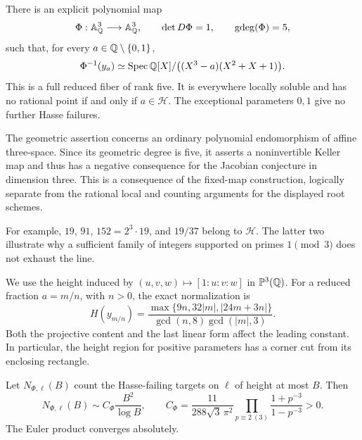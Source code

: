 \begin{theorem}
\label{thm:main}
There is an explicit polynomial map
\[
 \Phi:\mathbb A^3_\mathbb Q\longrightarrow\mathbb A^3_\mathbb Q,
 \qquad \det D\Phi=1,\qquad \operatorname{gdeg}(\Phi)=5,
\]
such that, for every \(a\in\mathbb Q\setminus\{0,1\}\),
\begin{equation}
 \Phi^{-1}(y_a)\simeq
 \operatorname{Spec}\mathbb Q[X]/\bigl((X^3-a)(X^2+X+1)\bigr).
 \label{eq:main-fiber}
\end{equation}
This is a full reduced fiber of rank five. It is everywhere locally
soluble and has no rational point if and only if \(a\in\mathcal H\).
The exceptional parameters \(0,1\) give no further Hasse failures.
\end{theorem}

The geometric assertion concerns an ordinary polynomial endomorphism of
affine three-space. Since its geometric degree is five, it asserts a
noninvertible Keller map and thus has a negative consequence for the
Jacobian conjecture in dimension three. This is a consequence of the
fixed-map construction, logically separate from the rational local and
counting arguments for the displayed root schemes.

For example, \(19\), \(91\), \(152=2^3\cdot19\), and \(19/37\) belong
to \(\mathcal H\). The latter two illustrate why a sufficient family of
integers supported on primes \(1\pmod3\) does not exhaust the line.

We use the height induced by \((u,v,w)\mapsto[1:u:v:w]\) in
\(\mathbb P^3(\mathbb Q)\). For a reduced fraction \(a=m/n\), with \(n>0\),
the exact normalization is
\begin{equation}
 H(y_{m/n})=
 \frac{\max\{9n,32|m|,|24m+3n|\}}
 {\gcd(n,8)\gcd(|m|,3)}.
 \label{eq:height-intro}
\end{equation}
Both the projective content and the last linear form affect the leading
constant. In particular, the height region for positive parameters has a
corner cut from its enclosing rectangle.

\begin{theorem}
\label{thm:rational-count-intro}
Let \(N_{\Phi,\ell}(B)\) count the Hasse-failing targets on \(\ell\) of
height at most \(B\). Then
\begin{equation}
 N_{\Phi,\ell}(B)\sim C_\Phi\frac{B^2}{\log B},\qquad
 C_\Phi=\frac{11}{288\sqrt3\,\pi^2}
 \prod_{p\equiv2\ (3)}\frac{1+p^{-3}}{1-p^{-3}}>0.
 \label{eq:rational-count-intro}
\end{equation}
The Euler product converges absolutely.
\end{theorem}

